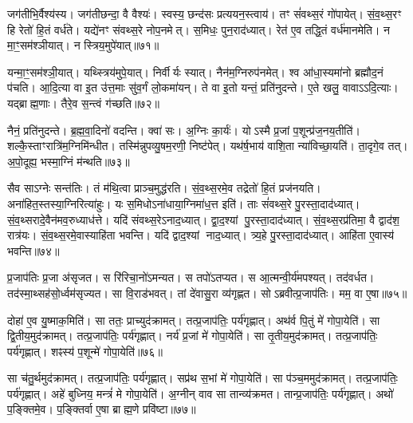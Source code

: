 जग॑तीभि॒र्वैश्य॑स्य।
जग॑तीछन्दा॒ वै वैश्यः॑।
स्वस्य॒ छन्द॑सः प्रत्ययन॒स्त्वाय॑।
तꣳ सं॑वथ्स॒रं गो॑पायेत्।
सं॒व॒थ्स॒रꣳ हि रेतो॑ हि॒तं वर्ध॑ते।
यद्ये॑नꣳ संवथ्स॒रे नोप॒नमेत्।
स॒मिधः॒ पुन॒राद॑ध्यात्।
रेत॑ ए॒व तद्धि॒तं वर्ध॑मानमेति।
न मा॒ꣳ॒सम॑श्ञीयात्।
न स्त्रिय॒मुपे॑यात्॥७१॥

यन्मा॒ꣳ॒सम॑श्ञी॒यात्।
यथ्स्त्रिय॑मुपे॒यात्।
निर्वीर्यः स्यात्।
नैन॑म॒ग्निरुप॑नमेत्।
श्व आ॑धा॒स्यमा॑नो ब्रह्मौद॒नं प॑चति।
आ॒दि॒त्या वा इ॒त उ॑त्त॒माः सु॑व॒र्गं लो॒कमा॑यन्।
ते वा इ॒तो यन्तं॒ प्रति॑नुदन्ते।
ए॒ते खलु॒ वावा\-ऽऽदि॒त्याः।
यद्ब्राह्म॒णाः।
तैरे॒व स॒न्त्वं ग॑च्छति॥७२॥

नैनं॒ प्रति॑नुदन्ते।
ब्र॒ह्म॒वा॒दिनो॑ वदन्ति।
क्वा॑ सः।
अ॒ग्निः का॒र्यः॑।
योऽस्मै प्र॒जां प॒शून्प्र॑ज॒नय॒तीति॑।
शल्कै॒स्ताꣳरात्रि॑म॒ग्निमि॑न्धीत।
तस्मि॑न्नुपव्यु॒षम॒रणी॒ निष्ट॑पेत्।
यथ॑र्\mbox{}ष॒भाय॑ वाशि॒ता न्या॑विच्छा॒यति॑।
ता॒दृगे॒व तत्।
अ॒पो॒दूह्य॒ भस्मा॒ग्निं म॑न्थति॥७३॥

सैव साऽग्नेः सन्त॑तिः।
तं म॑थि॒त्वा प्राञ्च॒मुद्ध॑रति।
सं॒व॒थ्स॒रमे॒व तद्रेतो॑ हि॒तं प्रज॑नयति।
अना॑हित॒स्तस्या॒ग्निरित्या॑हुः।
यः स॒मिधो\-ऽना॑धाया॒ग्निमा॑ध॒त्त इति॑।
ताः सं॑वथ्स॒रे पु॒रस्ता॒दाद॑ध्यात्।
सं॒व॒थ्सरादे॒वैन॑मव॒रुध्याध॑त्ते।
यदि॑ संवथ्स॒रे\-ऽनाद॒ध्यात्।
द्वा॒द॒श्यां पु॒रस्ता॒दाद॑ध्यात्।
सं॒व॒थ्स॒रप्र॑तिमा॒ वै द्वाद॑श॒ रात्र॑यः।
सं॒व॒थ्स॒रमे॒वास्याहि॑ता भवन्ति।
यदि॑ द्वाद॒श्यां नाद॒ध्यात्।
त्र्य॒हे पु॒रस्ता॒दाद॑ध्यात्।
आहि॑ता ए॒वास्य॑ भवन्ति॥७४॥

प्र॒जाप॑तिः प्र॒जा अ॑सृजत।
स रि॑रिचा॒नो॑\-ऽमन्यत।
स तपो॑\-ऽतप्यत।
स आ॒त्मन्वी॒र्य॑मपश्यत्।
तद॑वर्धत।
तद॑स्मा॒थ्सह॑सो॒र्ध्वम॑सृज्यत।
सा वि॒राड॑भवत्।
तां दे॑वासु॒रा व्य॑गृह्णत।
सोऽब्रवीत्प्र॒जाप॑तिः।
मम॒ वा ए॒षा॥७५॥

दोहा॑ ए॒व यु॒ष्माक॒मिति॑।
सा ततः॒ प्राच्युद॑क्रामत्।
तत्प्र॒जाप॑तिः॒ पर्य॑गृह्णात्।
अथ॑र्व पि॒तुं मे॑ गोपा॒येति॑।
सा द्वि॒तीय॒मुद॑क्रामत्।
तत्प्र॒जाप॑तिः॒ पर्य॑गृह्णात्।
नर्य॑ प्र॒जां मे॑ गोपा॒येति॑।
सा तृ॒तीय॒मुद॑क्रामत्।
तत्प्र॒जाप॑तिः॒ पर्य॑गृह्णात्।
शꣴस्य॑ प॒शून्मे॑ गोपा॒येति॑॥७६॥

सा च॑तु॒र्थमुद॑क्रामत्।
तत्प्र॒जाप॑तिः॒ पर्य॑गृह्णात्।
सप्र॑थ स॒भां मे॑ गोपा॒येति॑।
सा प॑ञ्च॒ममुद॑क्रामत्।
तत्प्र॒जाप॑तिः॒ पर्य॑गृह्णात्।
अहे॑ बुध्निय॒ मन्त्रं॑ मे गोपा॒येति॑।
अ॒ग्नीन् वाव सा तान्व्य॑क्रमत।
तान्प्र॒जाप॑तिः॒ पर्य॑गृह्णात्।
अथो॑ प॒ङ्क्तिमे॒व।
प॒ङ्क्तिर्वा ए॒षा ब्राह्म॒णे प्रवि॑ष्टा॥७७॥


